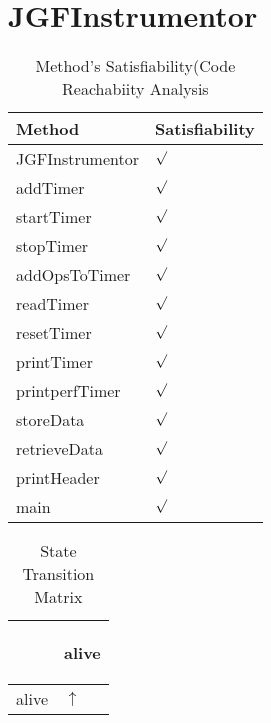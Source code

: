 \documentclass[10pt]{article}
\begin{document}
\section{{\color{Fuchsia}JGFInstrumentor}}
\label{JGFInstrumentor}
\begin{longtable}{|l|l|}
\caption{Method's Satisfiability(Code Reachabiity Analysis}\\
\hline
Method & Satisfiability\\
\hline
JGFInstrumentor&{\color{blue}$\surd$}\\
\hline
addTimer&{\color{blue}$\surd$}\\
\hline
startTimer&{\color{blue}$\surd$}\\
\hline
stopTimer&{\color{blue}$\surd$}\\
\hline
addOpsToTimer&{\color{blue}$\surd$}\\
\hline
readTimer&{\color{blue}$\surd$}\\
\hline
resetTimer&{\color{blue}$\surd$}\\
\hline
printTimer&{\color{blue}$\surd$}\\
\hline
printperfTimer&{\color{blue}$\surd$}\\
\hline
storeData&{\color{blue}$\surd$}\\
\hline
retrieveData&{\color{blue}$\surd$}\\
\hline
printHeader&{\color{blue}$\surd$}\\
\hline
main&{\color{blue}$\surd$}\\
\hline
\end{longtable}
\begin{longtable}{|l|l|}
\caption{State Transition Matrix}\\
\hline
&\begin{sideways}alive\end{sideways}\\
\hline
alive&{\color{blue}$\uparrow$}\\
\hline
\end{longtable}
\end{document}
